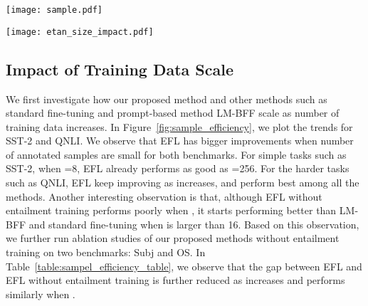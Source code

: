 \documentclass{article}
\begin{document}
\begin{figure*}[t]
  \centering
  \texttt{[image: sample.pdf]}
  \caption{Sample efficiency of standard fine-tuning, LM-BFF, our proposed EFL and EFL without entailment pre-training as a function of  (number of instances per class).}
  \label{fig:sample_efficiency}
\end{figure*}
\begin{figure*}[ht]
  \centering
  \texttt{[image: etan\_size\_impact.pdf]}
  \caption{Impact of pre-trained Language model size on standard fine-tuning, LM-BFF and our proposed method EFL.}
  \label{fig:model_size}
\end{figure*}

\subsection{Impact of Training Data Scale}

We first investigate how our proposed method and other methods such as standard fine-tuning and prompt-based method LM-BFF scale as number of training data  increases. In Figure~\ref{fig:sample_efficiency}, we plot the trends for SST-2 and QNLI. We observe that EFL has bigger improvements when number of annotated samples are small for both benchmarks. For simple tasks such as SST-2, when =8, EFL already performs as good as =256. For the harder tasks such as QNLI, EFL keep improving as  increases, and perform best among all the methods. Another interesting observation is that, although EFL without entailment training performs poorly when , it starts performing better than LM-BFF and standard fine-tuning when  is larger than 16. Based on this observation, we further run ablation studies of our proposed methods without entailment training on two benchmarks: Subj and OS. In Table~\ref{table:sampel_efficiency_table}, we observe that the gap between EFL and EFL without entailment training is further reduced as  increases and performs similarly when .

\begin{table*}[h]
\centering
\renewcommand{\arraystretch}{1.1}
\caption{Ablation studies of proposed EFL method without entailment training.}
\label{table:sampel_efficiency_table}
\end{table*}
\end{document}
